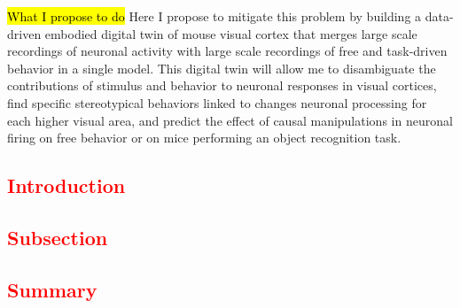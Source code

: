 \documentclass[B2,COG]{ercgrant}
\begin{document}


\hl{What I propose to do} Here I propose to mitigate this problem by building a data-driven embodied digital twin of mouse visual cortex that merges large scale recordings of neuronal activity with large scale recordings of free and task-driven behavior in a single model. 
This digital twin will allow me to  disambiguate the contributions of stimulus and behavior to neuronal responses in visual cortices,  find specific stereotypical behaviors linked to changes neuronal processing for each higher visual area, and  predict the effect of causal manipulations in neuronal firing on free behavior or on mice performing an object recognition task. 
\color{red}
\subsection{\textcolor{red}{Introduction}}\label{sec:stateofart:intro}
\blindtext[5]

\subsection{\textcolor{red}{Subsection}}\label{sec:stateofart:subsection}
\blindtext[2]

\blindtext[2]

\subsection{\textcolor{red}{Summary}}\label{sec:stateofart:summary}
\blindtext[2]
\color{black}
\end{document}
